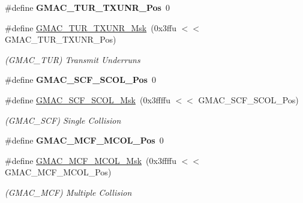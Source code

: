 \begin{DoxyCompactItemize}
\mbox{\label{group__SAMV71__GMAC_ga062f04c7a6dee79bdbb10efbf59deffd}} 
\#define {\bfseries G\+M\+A\+C\+\_\+\+T\+U\+R\+\_\+\+T\+X\+U\+N\+R\+\_\+\+Pos}~0
\item 
\mbox{\label{group__SAMV71__GMAC_gaa9b49f63b260b2de7f2338b7bda3f757}} 
\#define \mbox{\hyperlink{group__SAMV71__GMAC_gaa9b49f63b260b2de7f2338b7bda3f757}{G\+M\+A\+C\+\_\+\+T\+U\+R\+\_\+\+T\+X\+U\+N\+R\+\_\+\+Msk}}~(0x3ffu $<$$<$ G\+M\+A\+C\+\_\+\+T\+U\+R\+\_\+\+T\+X\+U\+N\+R\+\_\+\+Pos)
\begin{DoxyCompactList}\small\item\em (G\+M\+A\+C\+\_\+\+T\+UR) Transmit Underruns \end{DoxyCompactList}\item 
\mbox{\label{group__SAMV71__GMAC_ga3310e9e563d3e9e0bb08130881eac51f}} 
\#define {\bfseries G\+M\+A\+C\+\_\+\+S\+C\+F\+\_\+\+S\+C\+O\+L\+\_\+\+Pos}~0
\item 
\mbox{\label{group__SAMV71__GMAC_ga7b01e090f293983e3ad730f54ea38bda}} 
\#define \mbox{\hyperlink{group__SAMV71__GMAC_ga7b01e090f293983e3ad730f54ea38bda}{G\+M\+A\+C\+\_\+\+S\+C\+F\+\_\+\+S\+C\+O\+L\+\_\+\+Msk}}~(0x3ffffu $<$$<$ G\+M\+A\+C\+\_\+\+S\+C\+F\+\_\+\+S\+C\+O\+L\+\_\+\+Pos)
\begin{DoxyCompactList}\small\item\em (G\+M\+A\+C\+\_\+\+S\+CF) Single Collision \end{DoxyCompactList}\item 
\mbox{\label{group__SAMV71__GMAC_ga9b33251f1657f6b8e02c06149702ef15}} 
\#define {\bfseries G\+M\+A\+C\+\_\+\+M\+C\+F\+\_\+\+M\+C\+O\+L\+\_\+\+Pos}~0
\item 
\mbox{\label{group__SAMV71__GMAC_gab4968cffa915c05f0870488d0f65e102}} 
\#define \mbox{\hyperlink{group__SAMV71__GMAC_gab4968cffa915c05f0870488d0f65e102}{G\+M\+A\+C\+\_\+\+M\+C\+F\+\_\+\+M\+C\+O\+L\+\_\+\+Msk}}~(0x3ffffu $<$$<$ G\+M\+A\+C\+\_\+\+M\+C\+F\+\_\+\+M\+C\+O\+L\+\_\+\+Pos)
\begin{DoxyCompactList}\small\item\em (G\+M\+A\+C\+\_\+\+M\+CF) Multiple Collision \end{DoxyCompactList}\item 
$$
\end{DoxyCompactItemize}
